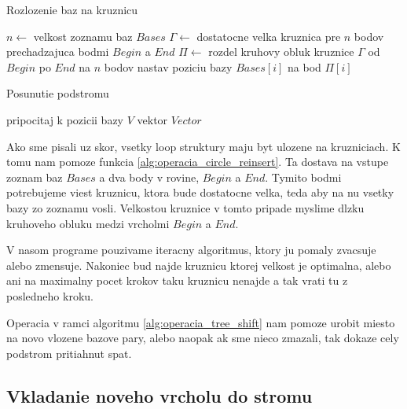 \begin{algorithm}
  \caption{Rozlozenie baz na kruznicu}
  \label{alg:operacia_circle_reinsert}
  \begin{algorithmic}[1]
      \State $n \gets$ velkost zoznamu baz $Bases$
      \State $\Gamma \gets$ dostatocne velka kruznica pre $n$ bodov prechadzajuca bodmi $Begin$ a $End$
      \State $\Pi \gets$ rozdel kruhovy obluk kruznice $\Gamma$ od $Begin$ po $End$ na $n$ bodov
        \State nastav poziciu bazy $Bases[i]$ na bod $\Pi[i]$
      \EndFor
    \EndProcedure
  \end{algorithmic}
\end{algorithm}

\begin{algorithm}
  \caption{Posunutie podstromu}
  \label{alg:operacia_tree_shift}
  \begin{algorithmic}[1]
          \State pripocitaj k pozicii bazy $V$ vektor $Vector$
        \EndIf
      \EndFor
    \EndProcedure
  \end{algorithmic}
\end{algorithm}

Ako sme pisali uz skor, vsetky loop struktury maju byt ulozene na kruzniciach. K tomu nam pomoze funkcia
\ref{alg:operacia_circle_reinsert}. Ta dostava na vstupe zoznam baz $Bases$ a dva body v rovine, $Begin$ a $End$.
Tymito bodmi potrebujeme viest kruznicu, ktora bude dostatocne velka, teda aby na nu vsetky bazy zo zoznamu vosli.
Velkostou kruznice v tomto pripade myslime dlzku kruhoveho obluku medzi vrcholmi $Begin$ a $End$.

V nasom programe pouzivame iteracny algoritmus, ktory ju pomaly zvacsuje alebo zmensuje.
Nakoniec bud najde kruznicu ktorej velkost je optimalna, alebo ani na maximalny pocet krokov taku kruznicu nenajde
a tak vrati tu z posledneho kroku.

Operacia v ramci algoritmu \ref{alg:operacia_tree_shift} nam pomoze urobit miesto na novo vlozene bazove pary,
alebo naopak ak sme nieco zmazali, tak dokaze cely podstrom pritiahnut spat.

\subsection{Vkladanie noveho vrcholu do stromu}

